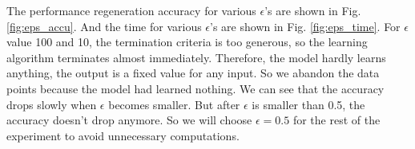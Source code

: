 %
%
The performance regeneration accuracy for various $\epsilon$'s are shown in Fig. \ref{fig:eps_accu}. And the time for various $\epsilon$'s are shown in Fig. \ref{fig:eps_time}. For $\epsilon$ value 100 and 10, the termination criteria is too generous, so the learning algorithm terminates almost immediately. Therefore, the model hardly learns anything, the output is a fixed value for any input. So we abandon the data points because the model had learned nothing. We can see that the accuracy drops slowly when $\epsilon$ becomes smaller. But after $\epsilon$ is smaller than 0.5, the accuracy doesn't drop anymore. So we will choose $\epsilon = 0.5 $ for the rest of the experiment to avoid unnecessary computations.


